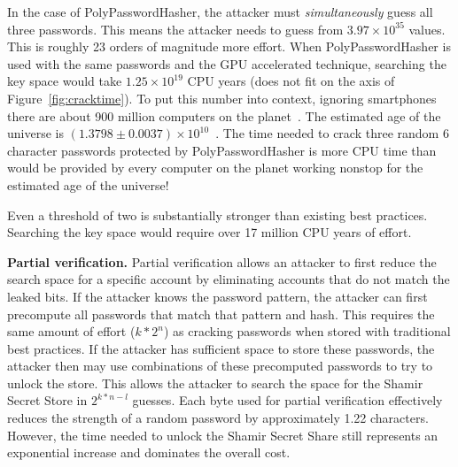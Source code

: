 In the case of PolyPasswordHasher, the attacker must \emph{simultaneously}
guess all three passwords.   This means the attacker needs to guess from 
$3.97 \times {10^{35}}$ values.   This is roughly 23 orders of magnitude more effort.
When PolyPasswordHasher is used with the same passwords and the GPU 
accelerated technique, searching the key space would take $1.25 \times 10^{19}$
CPU years (does not fit on the axis of Figure~\ref{fig:cracktime}).   To put 
this number into context,
ignoring smartphones there are about 900 million computers on the 
planet~\cite{computersexisting}.   The estimated age of the universe is 
$(1.3798 \pm 0.0037) \times 10^{10}$~\cite{universeage}.   The time needed to crack 
three random 6 character passwords protected
by PolyPasswordHasher is more CPU time than would be provided by every computer 
on the planet working nonstop for the estimated age of the universe!

Even a threshold of two is substantially stronger than existing
best practices.   Searching the key space would require over 17 million CPU 
years of effort.


{\bf Partial verification.}
Partial verification allows an attacker to first reduce the search space for
a specific account by eliminating accounts that do not match the leaked bits.
If the attacker knows the password pattern, the attacker can first 
precompute all passwords that match that pattern and hash.   This requires
the same amount of effort ($k*2^n$) as cracking passwords when stored with 
traditional best practices.   If the attacker has sufficient space to
store these passwords, the attacker then may use combinations of
these precomputed passwords to try to unlock the store.  This allows
the attacker to search the space for the Shamir Secret Store in $2^{k*n-l}$ 
guesses. 
Each byte used for partial verification effectively
reduces the strength of a random password by approximately 1.22 characters.
However, the time needed to unlock the Shamir Secret Share still represents
an exponential increase and dominates the overall cost.

